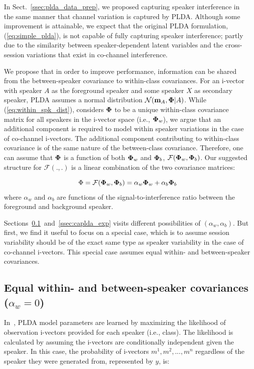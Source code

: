In Sect.~\ref{ssec:plda_data_prep}, we proposed capturing speaker interference in the same manner that channel variation is captured by PLDA. 
Although some improvement is attainable, we expect that the original PLDA formulation, (\ref{eq:simple_plda}), is not capable of fully capturing speaker interference; partly due to the similarity between speaker-dependent latent variables and the cross-session variations that exist in co-channel interference. 

We propose that in order to improve performance, information can be shared from the between-speaker covariance to within-class covariances. 
For an i-vector with speaker $A$ as the foreground speaker and some speaker $X$ as secondary speaker, PLDA assumes a normal distribution $\mathcal{N} ({\bf m}_A,{\bf \Phi} | A)$. 
While (\ref{eq:within_spk_dist}), considers ${\bf \Phi}$ to be a unique within-class covariance matrix for all speakers in the i-vector space (i.e., ${\bf \Phi}_w$), we argue that an additional component is required to model within speaker variations in the case of co-channel i-vectors. 
The additional component contributing to within-class covariance is of the same nature of the between-class covariance. 
Therefore, one can assume that ${\bf \Phi}$ is a function of both ${\bf \Phi}_w$ and ${\bf \Phi}_b$, $ \mathcal{F} ({\bf \Phi}_w,{\bf \Phi}_b)$. 
Our suggested structure for $ \mathcal{F} (.,.)$ is a linear combination of the two covariance matrices: 

\begin{equation}
\label{eq:complex_phiw}
\Phi = \mathcal{F} ({\bf \Phi}_w,{\bf \Phi}_b) = 
\alpha_w{\bf \Phi}_w + \alpha_b{\bf \Phi}_b
\end{equation}
where $\alpha_w$ and $\alpha_b$ are functions of the signal-to-interference ratio between the foreground and background speaker. 

Sections~\ref{ssec:alpha_w_0}~and~\ref{ssec:caplda_exp} visits different possibilities of $(\alpha_w, \alpha_b)$. But first, we find it useful to focus on a special case, which is to assume session variability should be of the exact same type as speaker variability in the case of co-channel i-vectors. 
This special case assumes equal within- and between-speaker covariances. 

\subsection{Equal within- and between-speaker covariances ($\alpha_w = 0$)}
\label{ssec:alpha_w_0}
In~\cite{ioffePLDA2006}, PLDA model parameters are learned by maximizing the likelihood of observation i-vectors provided for each speaker (i.e., class). 
The likelihood is calculated by assuming the i-vectors are conditionally independent given the speaker. 
In this case, the probability of i-vectors $m^1, m^2, ..., m^n$ regardless of the speaker they were generated from, represented by $y$, is:

